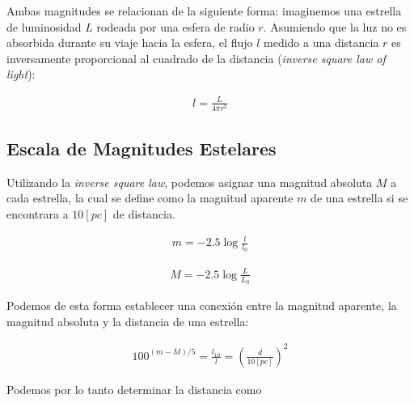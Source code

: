 \documentclass{tufte-handout}
\begin{document}
Ambas magnitudes se relacionan de la siguiente forma: imaginemos una estrella de luminosidad $L$ rodeada por una esfera de radio $r$. Asumiendo que la luz no es absorbida durante su viaje hacia la esfera, el flujo $l$ medido a una distancia $r$ es inversamente proporcional al cuadrado de la distancia (\emph{inverse square law of light}):

\begin{align}
  l = \frac{L}{4\pi r^2}
\end{align}

\subsection{Escala de Magnitudes Estelares}

Utilizando la \emph{inverse square law}, podemos asignar una magnitud absoluta $M$ a cada estrella, la cual se define como la magnitud aparente $m$ de una estrella si se encontrara a $10 [pc]$ de distancia.


\begin{align}
  m = -2.5 \log{\frac{l}{l_0}}
\end{align}

\begin{align}
  M = -2.5 \log{\frac{L}{L_0}}
\end{align}

Podemos de esta forma establecer una conexión entre la magnitud aparente, la magnitud absoluta y la distancia de una estrella:

\begin{align}
  100^{(m - M)/5} = \frac{l_{10}}{l} = (\frac{d}{10 [pc]})^2
\end{align}

Podemos por lo tanto determinar la distancia como
\end{document}
